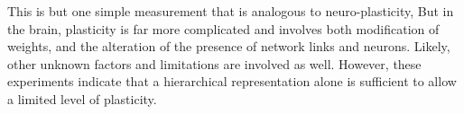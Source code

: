 \documentclass[12pt]{article}
\begin{document}
\begin{doublespacing}
	This is but one simple measurement that is analogous to neuro-plasticity, But in the brain, plasticity is far more complicated and involves both modification of weights, and the alteration of the presence of network links and neurons. Likely, other unknown factors and limitations are involved as well. However, these experiments indicate that a hierarchical representation alone is sufficient to allow a limited level of plasticity.

\end{doublespacing}

\nocite{huiskes08}

\singlespacing


\end{document}
